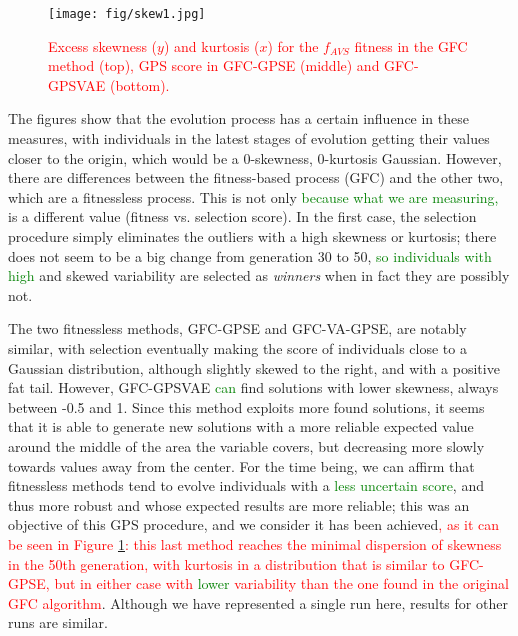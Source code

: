 \documentclass[10pt,journal,compsoc]{IEEEtran}
\begin{document}
\begin{figure}[ht]	
	\begin{center}
		\texttt{[image: fig/skew1.jpg]}
		\caption{\textcolor{red}{Excess skewness ($y$) and kurtosis ($x$)
			for the $f_{AVS}$ fitness in the  {\sf GFC} method \cite{salem_cig2018} (top), GPS score in {\sf GFC-GPSE} (middle) and {\sf GFC-GPSVAE} (bottom).}}
		\label{fig:gfcsk}
	\end{center}	
\end{figure}
The figures show that the evolution process has a certain influence in
these measures, with individuals in the latest stages of evolution
getting their values closer to the origin, which would be a 0-skewness, 0-kurtosis
Gaussian. However, there are differences between the fitness-based
process ({\sf GFC}) and the other two, which are a fitnessless process. This is not only  \textcolor{green}{because what we are measuring,} is a different value (fitness vs. selection score). 
In the first case, the
selection procedure simply eliminates the outliers with a high
skewness or kurtosis; there does not seem to be a big change from
generation 30 to 50,  \textcolor{green}{so individuals with  high}
and skewed variability are selected as {\em winners} when in fact they
are possibly not.

The two fitnessless methods, {\sf GFC-GPSE} and {\sf GFC-VA-GPSE}, are
notably similar, with selection eventually making the score of
individuals close to a Gaussian distribution, although slightly skewed
to the right, and with a positive fat tail. However, {\sf GFC-GPSVAE}
 \textcolor{green}{can} find solutions with lower skewness, always between -0.5 and
1. Since this method exploits more found solutions, it seems that it
is able to generate new solutions with a more reliable expected value
around the middle of the area the variable covers, but decreasing more
slowly towards values away from the center. For the time being, we can
affirm that fitnessless methods tend to evolve individuals with a  \textcolor{green}{less uncertain score}, and thus more robust and whose expected
results are more reliable; this was an objective of this GPS
procedure, and we consider it has been achieved\textcolor{red}{, as it can be seen in
Figure \ref{fig:gfcsk}: this last method reaches the minimal
dispersion of skewness in the 50th generation, with kurtosis in a
distribution that is similar to {\sf GFC-GPSE}, but in either case
with  \textcolor{green}{lower} variability than the one found in the original {\sf GFC} algorithm}. Although we have
represented a single run here, results for other runs are similar.
\end{document}
